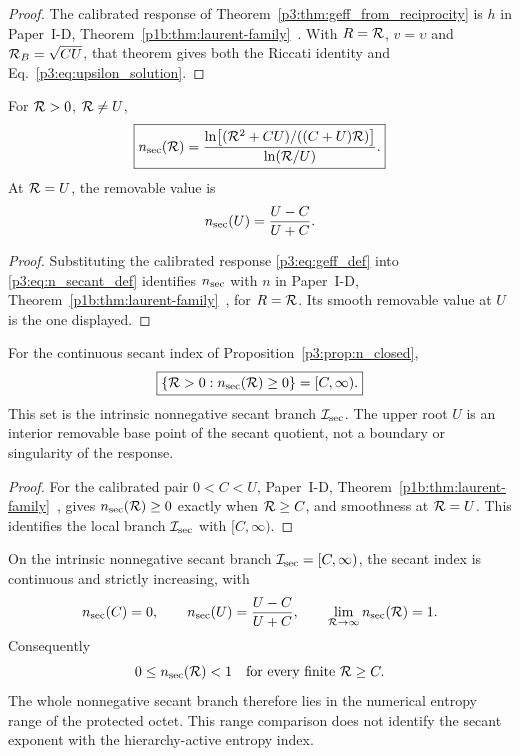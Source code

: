 \documentclass[12pt,a4paper]{article}
\begin{document}
\begin{proof}
The calibrated response of Theorem~\ref{p3:thm:geff_from_reciprocity}
is \(h\) in Paper~I-D,
Theorem~\ref{p1b:thm:laurent-family}~\cite{Kugelmann2026Paper1D}.
With \(R=\mathcal R\), \(v=\upsilon\) and \(\mathcal R_B=\sqrt{CU}\), that
theorem gives both the Riccati identity and
Eq.~\eqref{p3:eq:upsilon_solution}.
\end{proof}

\begin{proposition}
\label{p3:prop:n_closed}
For \(\mathcal R>0\), \(\mathcal R\ne U\),
\begin{equation}
\boxed{
n_{\rm sec}(\mathcal R)
=
\frac{\ln\!\big[(\mathcal R^2+CU)/((C+U)\mathcal R)\big]}
     {\ln(\mathcal R/U)}.
}
\end{equation}
At \(\mathcal R=U\), the removable value is
\[
 n_{\rm sec}(U)=\frac{U-C}{U+C}.
\]
\end{proposition}

\begin{proof}
Substituting the calibrated response \eqref{p3:eq:geff_def} into
\eqref{p3:eq:n_secant_def} identifies \(n_{\rm sec}\) with \(n\) in
Paper~I-D, Theorem~\ref{p1b:thm:laurent-family}~\cite{Kugelmann2026Paper1D},
for \(R=\mathcal R\).  Its smooth removable value at \(U\) is the one displayed.
\end{proof}

\begin{proposition}
\label{p3:def:active-reduced-window}
For the continuous secant index of Proposition~\ref{p3:prop:n_closed},
\[
 \boxed{\{\mathcal R>0:n_{\rm sec}(\mathcal R)\ge0\}=[C,\infty).}
\]
This set is the intrinsic nonnegative secant branch
\(\mathcal I_{\rm sec}\).  The upper root \(U\) is an interior removable base
point of the secant quotient, not a boundary or singularity of the response.
\end{proposition}

\begin{proof}
For the calibrated pair \(0<C<U\), Paper~I-D,
Theorem~\ref{p1b:thm:laurent-family}~\cite{Kugelmann2026Paper1D}, gives
\(n_{\rm sec}(\mathcal R)\ge0\) exactly when \(\mathcal R\ge C\), and smoothness
at \(\mathcal R=U\).  This identifies the local branch
\(\mathcal I_{\rm sec}\) with \([C,\infty)\).
\end{proof}

\begin{theorem}
\label{p3:thm:exact-calibrated-secant-range}
\label{p3:thm:entropy-domain-obstruction-active-branches}
On the intrinsic nonnegative secant branch
\(\mathcal I_{\rm sec}=[C,\infty)\), the secant index is continuous and
strictly increasing, with
\[
 n_{\rm sec}(C)=0,
 \qquad
 n_{\rm sec}(U)=\frac{U-C}{U+C},
 \qquad
 \lim_{\mathcal R\to\infty}n_{\rm sec}(\mathcal R)=1.
\]
Consequently
\[
 0\le n_{\rm sec}(\mathcal R)<1
 \quad\text{for every finite }\mathcal R\ge C.
\]
The whole nonnegative secant branch therefore lies in the numerical entropy
range of the protected octet.  This range comparison does not identify the
secant exponent with the hierarchy-active entropy index.
\end{theorem}
\end{document}
